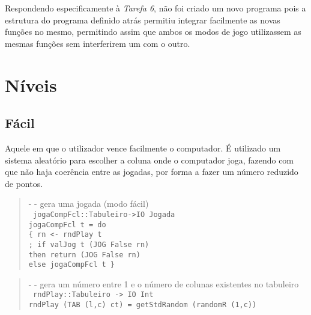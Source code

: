 \documentclass[a4paper,titlepage]{scrreprt}
\begin{document}
Respondendo especificamente à {\it Tarefa 6}, não foi criado um novo programa pois a estrutura do programa definido atrás permitiu integrar
facilmente as novas funções no mesmo, permitindo assim que ambos os modos de jogo utilizassem as mesmas funções sem interferirem um com o outro.
	\section{Níveis}
		\subsection{Fácil}
		Aquele em que o utilizador vence facilmente o computador. É utilizado um sistema aleatório para escolher a coluna onde o
		computador joga, fazendo com que não haja coerência entre as jogadas, por forma a fazer um número reduzido de pontos.
			\begin{quote}
				{\small - - gera uma jogada (modo fácil)\\}
				{\tt
				jogaCompFcl::Tabuleiro->IO Jogada\\
				jogaCompFcl t = do\\
				\{ rn <- rndPlay t\\
				; if valJog t (JOG False rn)\\
				then return (JOG False rn)\\
				else jogaCompFcl t
				\}
				}
			\end{quote}
			\begin{quote}
				{\small - - gera um número entre 1 e o número de colunas existentes no tabuleiro\\}
				{\tt
				rndPlay::Tabuleiro -> IO Int\\
				rndPlay (TAB (l,c) ct) = getStdRandom (randomR (1,c))
				}
			\end{quote}
\end{document}
